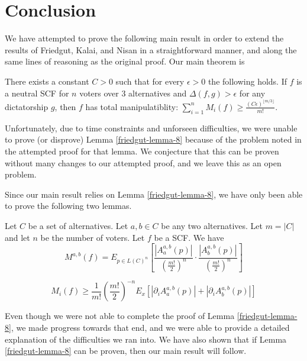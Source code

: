 
\chapter{Conclusion}

	We have attempted to prove the following main result in order to extend the results of Friedgut, Kalai, and Nisan in a straightforward manner, and along the same lines of reasoning as the original proof. Our main theorem is

	\begin{theorem}
		There exists a constant $C > 0$ such that for every $\epsilon > 0$ the following holds. If $f$ is a neutral SCF for $n$ voters over 3 alternatives and $\Delta(f, g) > \epsilon$ for any dictatorship $g$, then $f$ has total manipulatiblity: $\sum^n_{i=1} M_i(f) \ge \frac{(C\epsilon)^{\lfloor m/3 \rfloor}}{m!}$.
	\end{theorem}

	Unfortunately, due to time constraints and unforseen difficulties, we were unable to prove (or disprove) Lemma \ref{friedgut-lemma-8} because of the problem noted in the attempted proof for that lemma. We conjecture that this can be proven without many changes to our attempted proof, and we leave this as an open problem.

	Since our main result relies on Lemma \ref{friedgut-lemma-8}, we have only been able to prove the following two lemmas.

	\begin{lemma}
		Let $C$ be a set of alternatives. Let $a, b \in C$ be any two alternatives. Let $m = |C|$ and let $n$ be the number of voters. Let $f$ be a SCF. We have
		\[
			M^{a,b}(f) = E_{p \in L(C)^n} \left[ \frac{|A^{a,b}_a(p)|}{\left(\frac{m!}{2}\right)^n} \cdot \frac{|A^{a,b}_b(p)|}{\left(\frac{m!}{2}\right)^n} \right]
		\]
	\end{lemma}

	\begin{lemma}
		\[
			M_i(f) \ge \frac{1}{m!} \left(\frac{m!}{2}\right)^{-n} E_x \left[|\partial_i A^{a,b}_a(p)| + |\partial_i A^{a,b}_b(p)| \right]
		\]
	\end{lemma}

	Even though we were not able to complete the proof of Lemma \ref{friedgut-lemma-8}, we made progress towards that end, and we were able to provide a detailed explanation of the difficulties we ran into. We have also shown that if Lemma \ref{friedgut-lemma-8} can be proven, then our main result will follow.

